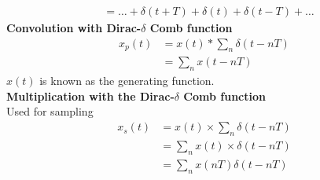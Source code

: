 \documentclass[6pt,landscape,a4paper]{extarticle}
\begin{document}
\begin{multicols*}{5}
\begin{align*}
        &= \ldots+\delta(t+T)+\delta(t)+\delta(t-T) + \ldots
    \end{align*}
    \textbf{Convolution with Dirac-$\delta$ Comb function}\\
    \begin{align*}
        x_p(t)&=x(t)*\sum_n\delta(t-nT)\\
        &=\sum_n x(t-nT)
    \end{align*}
    $x(t)$ is known as the generating function.\\
    \textbf{Multiplication with the Dirac-$\delta$ Comb function}\\
    Used for sampling
    \begin{align*}
        x_s(t)&=x(t)\times\sum_n\delta(t-nT)\\
        &=\sum_nx(t)\times\delta(t-nT)\\
        &=\sum_nx(nT)\delta(t-nT)
    \end{align*}
    

\end{multicols*}
\end{document}
